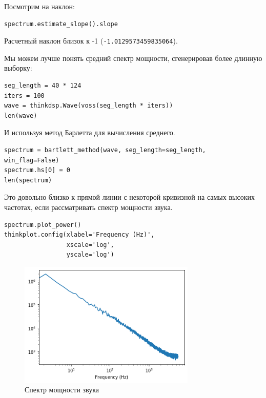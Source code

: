 \documentclass[a4paper,12pt]{report}
\begin{document}
Посмотрим на наклон:

\begin{lstlisting}[caption=Наклон прямой]
spectrum.estimate_slope().slope
\end{lstlisting}

Расчетный наклон близок к -1 (\texttt{-1.0129573459835064}).

Мы можем лучше понять средний спектр мощности, сгенерировав более длинную выборку:

\begin{lstlisting}[caption=Генерация более длинной выборки]
seg_length = 40 * 124
iters = 100
wave = thinkdsp.Wave(voss(seg_length * iters))
len(wave)
\end{lstlisting}

И используя метод Барлетта для вычисления среднего.

\begin{lstlisting}[caption=Использование метода Барлетта]
spectrum = bartlett_method(wave, seg_length=seg_length, win_flag=False)
spectrum.hs[0] = 0
len(spectrum)
\end{lstlisting}

Это довольно близко к прямой линии с некоторой кривизной на самых высоких частотах, если рассматривать спектр мощности звука.

\begin{lstlisting}[caption=Спектр мощности звука]
spectrum.plot_power()
thinkplot.config(xlabel='Frequency (Hz)',
                 xscale='log', 
                 yscale='log')
\end{lstlisting}

\begin{figure}[H]
        \centering
        \includegraphics[width=0.75\textwidth]{lab4_fig5_3.png}
        \caption{Спектр мощности звука}
        \label{fig:lab4_fig5_3}
\end{figure}
\end{document}
